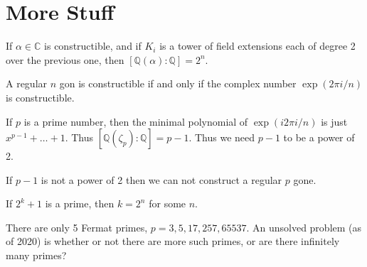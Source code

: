 \documentclass{article}                                                        %
\begin{document}
    \section{More Stuff}
        If $\alpha\in\mathbb{C}$ is constructible, and if
        $K_{i}$ is a tower of field extensions each of degree 2 over the
        previous one, then $[\mathbb{Q}(\alpha):\mathbb{Q}]=2^{n}$.
        \begin{theorem}
            A regular $n$ gon is constructible if and only if the complex number
            $\exp(2\pi{i}/n)$ is constructible.
        \end{theorem}
        If $p$ is a prime number, then the minimal polynomial of
        $\exp(i2\pi{i}/n)$ is just $x^{p-1}+\dots+1$. Thus
        $[\mathbb{Q}(\zeta_{p}):\mathbb{Q}]=p-1$. Thus we need $p-1$ to be a
        power of 2.
        \begin{theorem}
            If $p-1$ is not a power of 2 then we can not construct a regular
            $p$ gone.
        \end{theorem}
        \begin{theorem}
            If $2^{k}+1$ is a prime, then $k=2^{n}$ for some $n$.
        \end{theorem}
        There are only 5 Fermat primes, $p=3,5,17,257,65537$. An unsolved
        problem (as of 2020) is whether or not there are more such primes, or
        are there infinitely many primes? 
\end{document}
